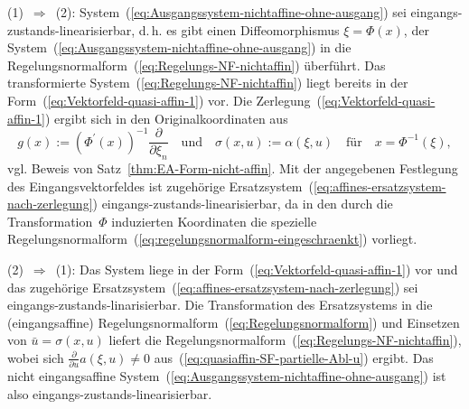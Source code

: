 \begin{svmultproof2}
(1)~$\Rightarrow$~(2): System~(\ref{eq:Ausgangssystem-nichtaffine-ohne-ausgang})
sei eingangs-zustands-linearisierbar, d.\,h. es gibt einen Diffeomorphismus
$\xi=\Phi(x)$, der System~(\ref{eq:Ausgangssystem-nichtaffine-ohne-ausgang})
in die Regelungsnormalform~(\ref{eq:Regelungs-NF-nichtaffin}) überführt.
Das transformierte System~(\ref{eq:Regelungs-NF-nichtaffin}) liegt
bereits in der Form~(\ref{eq:Vektorfeld-quasi-affin-1}) vor. Die
Zerlegung~(\ref{eq:Vektorfeld-quasi-affin-1}) ergibt sich in den
Originalkoordinaten aus 
\[
g(x):=\left(\Phi^{\prime}(x)\right)^{-1}\frac{\partial}{\partial\xi_{n}}\quad\text{und}\quad\sigma(x,u):=\alpha(\xi,u)\quad\text{für}\quad x=\Phi^{-1}(\xi),
\]
vgl. Beweis von Satz~\ref{thm:EA-Form-nicht-affin}. Mit der angegebenen
Festlegung des Eingangsvektorfeldes ist zugehörige Ersatzsystem~(\ref{eq:affines-ersatzsystem-nach-zerlegung})
eingangs-zustands-linearisierbar, da in den durch die Transformation~$\Phi$
induzierten Koordinaten die spezielle Regelungsnormalform~(\ref{eq:regelungsnormalform-eingeschraenkt})
vorliegt.

(2)~$\Rightarrow$~(1): Das System liege in der Form~(\ref{eq:Vektorfeld-quasi-affin-1})
vor und das zugehörige Ersatzsystem~(\ref{eq:affines-ersatzsystem-nach-zerlegung})
sei eingangs-zustands-linarisierbar. Die Transformation des Ersatzsystems
in die (eingangsaffine) Regelungsnormalform~(\ref{eq:Regelungsnormalform})
und Einsetzen von $\bar{u}=\sigma(x,u)$ liefert die Regelungsnormalform~(\ref{eq:Regelungs-NF-nichtaffin}),
wobei sich $\frac{\partial}{\partial u}a(\xi,u)\neq0$ aus~(\ref{eq:quasiaffin-SF-partielle-Abl-u})
ergibt. Das nicht eingangsaffine System~(\ref{eq:Ausgangssystem-nichtaffine-ohne-ausgang})
ist also eingangs-zustands-linearisierbar.


\end{svmultproof2}

